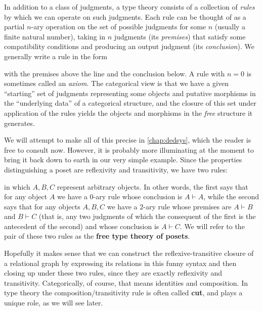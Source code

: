 \documentclass{book}
\let\types\vdash
\begin{document}
In addition to a class of judgments, a type theory consists of a collection of \emph{rules} by which we can operate on such judgments.
Each rule can be thought of as a partial $n$-ary operation on the set of possible judgments for some $n$ (usually a finite natural number), taking in $n$ judgments (its \emph{premises}) that satisfy some compatibility conditions and producing an output judgment (its \emph{conclusion}).
We generally write a rule in the form
\begin{mathpar}
\end{mathpar}
with the premises above the line and the conclusion below.
A rule with $n=0$ is sometimes called an \emph{axiom}.
The categorical view is that we have a given ``starting'' set of judgments representing some objects and putative morphisms in the ``underlying data'' of a categorical structure, and the closure of this set under application of the rules yields the objects and morphisms in the \emph{free} structure it generates.

We will attempt to make all of this precise in \cref{chap:dedsys}, which the reader is free to consult now.
However, it is probably more illuminating at the moment to bring it back down to earth in our very simple example.
Since the properties distinguishing a poset are reflexivity and transitivity, we have two rules:
in which $A,B,C$ represent arbitrary objects.
In other words, the first says that for any object $A$ we have a $0$-ary rule whose conclusion is $A\types A$, while the second says that for any objects $A,B,C$ we have a $2$-ary rule whose premises are $A\types B$ and $B\types C$ (that is, any two judgments of which the consequent of the first is the antecedent of the second) and whose conclusion is $A\types C$.
We will refer to the pair of these two rules as the \textbf{free type theory of posets}.

Hopefully it makes sense that we can construct the reflexive-transitive closure of a relational graph by expressing its relations in this funny syntax and then closing up under these two rules, since they are exactly reflexivity and transitivity.
Categorically, of course, that means identities and composition.
In type theory the composition/transitivity rule is often called \textbf{cut}, and plays a unique role, as we will see later.
\end{document}
